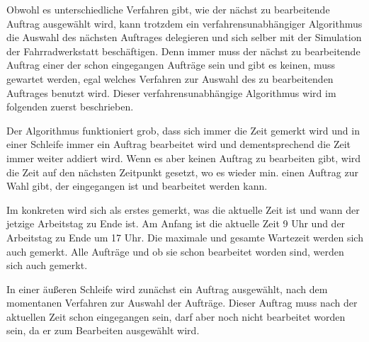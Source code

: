 \documentclass[a4paper,10pt,ngerman]{scrartcl}
\begin{document}
Obwohl es unterschiedliche Verfahren gibt, wie der nächst zu bearbeitende Auftrag ausgewählt wird,
kann trotzdem ein verfahrensunabhängiger Algorithmus die Auswahl des nächsten Auftrages delegieren
und sich selber mit der Simulation der Fahrradwerkstatt beschäftigen.
Denn immer muss der nächst zu bearbeitende Auftrag
einer der schon eingegangen Aufträge sein und gibt es keinen, muss gewartet werden,
egal welches Verfahren zur Auswahl des zu bearbeitenden Auftrages benutzt wird.
Dieser verfahrensunabhängige Algorithmus wird im folgenden zuerst beschrieben.

Der Algorithmus funktioniert grob,
dass sich immer die Zeit gemerkt wird
und in einer Schleife immer ein Auftrag bearbeitet wird
und dementsprechend die Zeit immer weiter addiert wird.
Wenn es aber keinen Auftrag zu bearbeiten gibt,
wird die Zeit auf den nächsten Zeitpunkt gesetzt,
wo es wieder min. einen Auftrag zur Wahl gibt,
der eingegangen ist und bearbeitet werden kann.

Im konkreten wird sich als erstes gemerkt, was die aktuelle Zeit ist und wann der jetzige Arbeitstag zu Ende ist.
Am Anfang ist die aktuelle Zeit 9 Uhr und der Arbeitstag zu Ende um 17 Uhr.
Die maximale und gesamte Wartezeit werden sich auch gemerkt.
Alle Aufträge und ob sie schon bearbeitet worden sind, werden sich auch gemerkt.

In einer äußeren Schleife wird zunächst ein Auftrag ausgewählt,
nach dem momentanen Verfahren zur Auswahl der Aufträge.
Dieser Auftrag muss nach der aktuellen Zeit schon eingegangen sein,
darf aber noch nicht bearbeitet worden sein, da er zum Bearbeiten ausgewählt wird.
\end{document}
